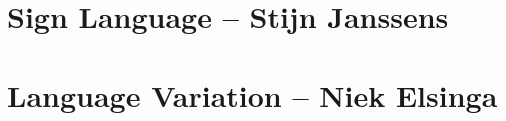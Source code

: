 



\section{Sign Language -- {\small Stijn Janssens}}

\section{Language Variation -- {\small Niek Elsinga}}


